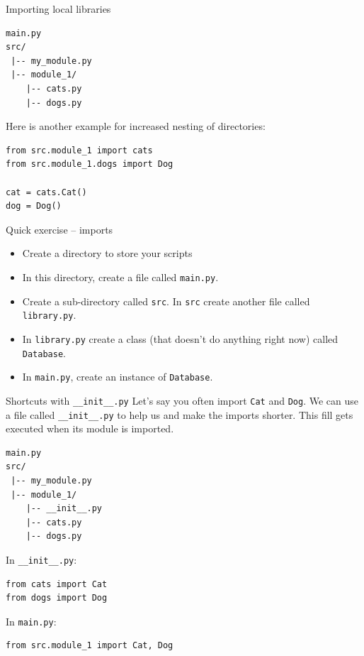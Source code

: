 \documentclass[10pt]{beamer}
\begin{document}
\begin{frame}[label={sec:org7c53d67},fragile]{Importing local libraries}
 \begin{verbatim}
main.py
src/
 |-- my_module.py
 |-- module_1/
	|-- cats.py
	|-- dogs.py
\end{verbatim}

Here is another example for increased nesting of directories:

\begin{verbatim}
from src.module_1 import cats
from src.module_1.dogs import Dog

cat = cats.Cat()
dog = Dog()
\end{verbatim}
\end{frame}


\begin{frame}[label={sec:orgb893a98},fragile]{Quick exercise -- imports}
 \begin{itemize}
\item Create a directory to store your scripts
\item In this directory, create a file called \texttt{main.py}.
\item Create a sub-directory called \texttt{src}. In \texttt{src} create another file called \texttt{library.py}.
\item In \texttt{library.py} create a class (that doesn't do anything right now) called \texttt{Database}.
\item In \texttt{main.py}, create an instance of \texttt{Database}.
\end{itemize}
\end{frame}

\begin{frame}[label={sec:org43fcbad},fragile]{Shortcuts with \texttt{\_\_init\_\_.py}}
 Let's say you often import \texttt{Cat} and \texttt{Dog}. We can use a file called \texttt{\_\_init\_\_.py} to help
us and make the imports shorter. This fill gets executed when its module is imported.

\begin{verbatim}
main.py
src/
 |-- my_module.py
 |-- module_1/
	|-- __init__.py
	|-- cats.py
	|-- dogs.py
\end{verbatim}

In \texttt{\_\_init\_\_.py}:

\begin{verbatim}
from cats import Cat
from dogs import Dog
\end{verbatim}

In \texttt{main.py}:

\begin{verbatim}
from src.module_1 import Cat, Dog
\end{verbatim}
\end{frame}
\end{document}
